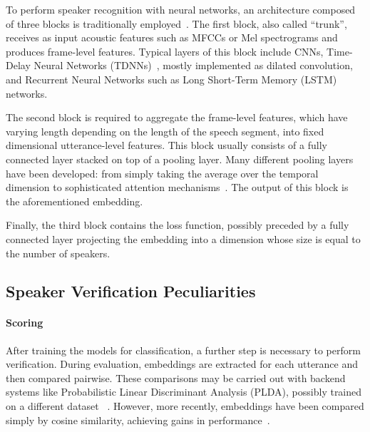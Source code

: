 \documentclass[conference]{IEEEtran}
\begin{document}

To perform speaker recognition with neural networks, an architecture composed of three blocks is traditionally employed~\cite{okabe2018asp}. The first block, also called ``trunk'', receives as input acoustic features such as MFCCs or Mel spectrograms and produces frame-level features. Typical layers of this block include CNNs, Time-Delay Neural Networks (TDNNs)~\cite{peddinti2015timedelay}, mostly implemented as dilated convolution, and Recurrent Neural Networks such as Long Short-Term Memory (LSTM) networks. 


The second block is required to aggregate the frame-level features, which have varying length depending on the length of the speech segment, into fixed dimensional utterance-level features. This block usually consists of a fully connected layer stacked on top of a pooling layer. Many different pooling layers have been developed: from simply taking the average over the temporal dimension to sophisticated attention mechanisms~\cite{cai2018exploring}. The output of this block is the aforementioned embedding.

Finally, the third block contains the loss function, possibly preceded by a fully connected layer projecting the embedding into a dimension whose size is equal to the number of speakers. 



\subsection{Speaker Verification Peculiarities}

\paragraph{Scoring}After training the models for classification, a further step is necessary to perform verification. During evaluation, embeddings are extracted for each utterance and then compared pairwise. These comparisons may be carried out with backend systems like Probabilistic Linear Discriminant Analysis (PLDA), possibly trained on a different dataset ~\cite{snyder2017deep}. However, more recently, embeddings have been compared simply by cosine similarity, achieving gains in performance~\cite{cai2018exploring}.
\end{document}
